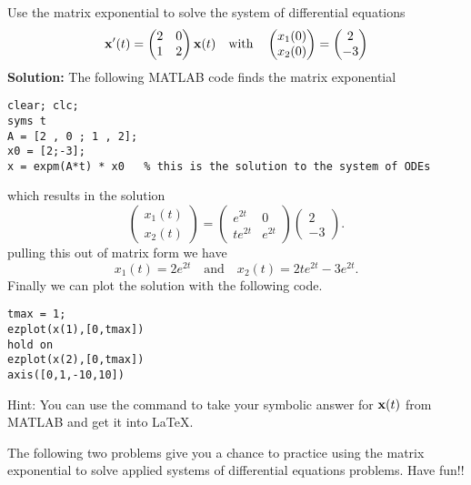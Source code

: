 \begin{example}
    Use the matrix exponential to solve the system of differential equations 
    \[ {\bf x}'(t) = \begin{pmatrix} 2 & 0 \\ 1 & 2 \end{pmatrix} {\bf x}(t) \quad \text{with}
        \quad \begin{pmatrix} x_1(0) \\ x_2(0) \end{pmatrix} = \begin{pmatrix} 2 \\ -3
    \end{pmatrix} \]
    {\bf Solution:} The following MATLAB code finds the matrix exponential
\begin{lstlisting}
clear; clc;
syms t
A = [2 , 0 ; 1 , 2];
x0 = [2;-3];
x = expm(A*t) * x0   % this is the solution to the system of ODEs
\end{lstlisting}
    which results in the solution 
    \[ \begin{pmatrix} x_1(t) \\ x_2(t) \end{pmatrix} = \begin{pmatrix} e^{2t} & 0 \\
        te^{2t} & e^{2t} \end{pmatrix} \begin{pmatrix} 2 \\ -3 \end{pmatrix}. \]
    pulling this out of matrix form we have
    \[ x_1(t) = 2e^{2t} \quad \text{and} \quad x_2(t) = 2te^{2t} - 3e^{2t}. \]
    Finally we can plot the solution with the following code.
\begin{lstlisting}
tmax = 1;
ezplot(x(1),[0,tmax])
hold on
ezplot(x(2),[0,tmax])
axis([0,1,-10,10])
\end{lstlisting}
\end{example}
Hint: You can use
the command  to take your symbolic answer for ${\bf x}(t)$ from MATLAB and get it into \LaTeX.

The following two problems give you a chance to practice using the matrix exponential to
solve applied systems of differential equations problems.  Have fun!!

